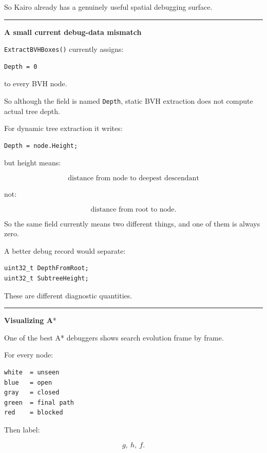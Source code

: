 So Kairo already has a genuinely useful spatial debugging surface.

\begin{center}\rule{0.5\linewidth}{0.5pt}\end{center}

\textbf{A small current debug-data mismatch}

\texttt{ExtractBVHBoxes()} currently assigns:

\begin{verbatim}
Depth = 0
\end{verbatim}

to every BVH node.

So although the field is named \texttt{Depth}, static BVH extraction does not compute actual tree depth.

For dynamic tree extraction it writes:

\begin{verbatim}
Depth = node.Height;
\end{verbatim}

but height means:

\[
\text{distance from node to deepest descendant}
\]

not:

\[
\text{distance from root to node}.
\]

So the same field currently means two different things, and one of them is always zero.

A better debug record would separate:

\begin{verbatim}
uint32_t DepthFromRoot;
uint32_t SubtreeHeight;
\end{verbatim}

These are different diagnostic quantities.

\begin{center}\rule{0.5\linewidth}{0.5pt}\end{center}

\textbf{Visualizing A}*

One of the best A* debuggers shows search evolution frame by frame.

For every node:

\begin{verbatim}
white  = unseen
blue   = open
gray   = closed
green  = final path
red    = blocked
\end{verbatim}

Then label:

\[
g,\ h,\ f.
\]

